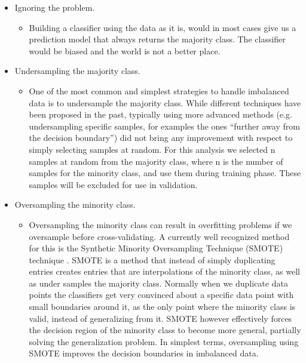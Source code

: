 \documentclass[12pt]{report}
\begin{document}
\begin{itemize}
  \item Ignoring the problem.
    \begin{itemize}
    \item Building a classifier using the data as it is, would in most cases give us a prediction model that always returns the majority class. The classifier would be biased and the world is not a better place.
  \end{itemize}
  \item Undersampling the majority class.
  \begin{itemize}
    \item One of the most common and simplest strategies to handle imbalanced data is to undersample the majority class.  While different techniques have been proposed in the past, typically using more advanced methods (e.g. undersampling specific samples, for examples the ones “further away from the decision boundary”) \cite{japkowicz2000class} did not bring any improvement with respect to simply selecting samples at random.  For this analysis we selected n samples at random from the majority class, where n is the number of samples for the minority class, and use them during training phase.  These samples will be excluded for use in validation.
  \end{itemize}
    \item Oversampling the minority class.
  \begin{itemize}
    \item Oversampling the minority class can result in overfitting problems if we oversample before cross-validating.  A currently well recognized method for this is the Synthetic Minority Oversampling Technique (SMOTE) technique \cite{chawla2002smote}.  SMOTE is a method that instead of simply duplicating entries creates entries that are interpolations of the minority class, as well as under samples the majority class. Normally when we duplicate data points the classifiers get very convinced about a specific data point with small boundaries around it, as the only point where the minority class is valid, instead of generalizing from it.  SMOTE however effectively forces the decision region of the minority class to become more general, partially solving the generalization problem.  In simplest terms, oversampling using SMOTE improves the decision boundaries in imbalanced data.
  \end{itemize}
\end{itemize}
\end{document}
